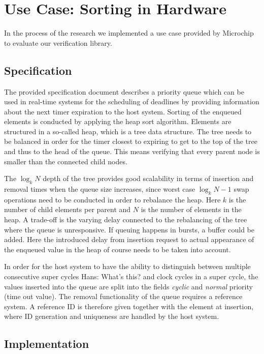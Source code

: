 \documentclass[runningheads]{llncs}
\newcommand{\hjd}[1]{{\color{pink} Hans: #1}}
\begin{document}
\section{Use Case: Sorting in Hardware}

In the process of the research we implemented a use case provided by Microchip to evaluate our verification library.

\subsection{Specification}

The provided specification document describes a priority queue which can be used in real-time systems for the scheduling of deadlines by providing information about the 
next timer expiration to the host system. Sorting of the enqueued elements is conducted by applying the heap sort algorithm. Elements are structured in a so-called 
heap, which is a tree data structure. The tree needs to be balanced in order for the
timer closest to expiring to get to the top of the tree and thus to the head of the queue. This means verifying that every parent node is smaller than the connected child nodes.


The $\log_k N$ depth of the tree provides good scalability in terms of insertion and removal times when the queue size increases, 
since worst case $\log_k N-1$ swap operations need to be conducted in order to rebalance the heap. Here $k$ is the number of child elements per parent and $N$
is the number of elements in the heap. A trade-off is the varying delay connected to the rebalancing of the tree where the queue is unresponsive. If queuing
happens in bursts, a buffer could be added. Here the introduced delay from insertion request to actual appearance of the enqueued value in the heap of course needs
to be taken into account.

In order for the host system to have the ability to distinguish between multiple consecutive super cycles \hjd{What's this?} and clock cycles in a super cycle, the values inserted 
into the queue are split into the fields \textit{cyclic} and \textit{normal} priority (time out value). The removal functionality of the queue requires a reference system. A reference 
ID is therefore given together with the element at insertion, where ID generation and uniqueness are handled by the host system.

\subsection{Implementation}
\end{document}
